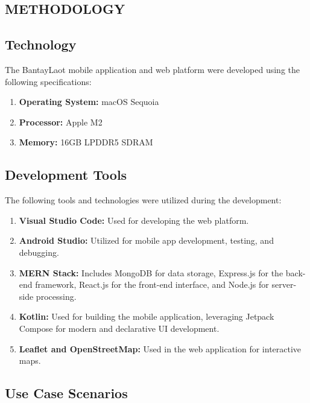 \documentclass{icsthesis}
\begin{document}
\begin{mainmatter}
        \section{METHODOLOGY}
            \subsection{Technology}
            The BantayLaot mobile application and web platform were developed using the following specifications:
            \begin{enumerate}
                \item \textbf{Operating System:} macOS Sequoia
                \item \textbf{Processor:} Apple M2
                \item \textbf{Memory:} 16GB LPDDR5 SDRAM
            \end{enumerate}
            
            \subsection{Development Tools}
            The following tools and technologies were utilized during the development:
            \begin{enumerate}
                \item \textbf{Visual Studio Code:} Used for developing the web platform.
                \item \textbf{Android Studio:} Utilized for mobile app development, testing, and debugging.
                \item \textbf{MERN Stack:} Includes MongoDB for data storage, Express.js for the back-end framework, React.js for the front-end interface, and Node.js for server-side processing.
                \item \textbf{Kotlin:} Used for building the mobile application, leveraging Jetpack Compose for modern and declarative UI development.
                \item \textbf{Leaflet and OpenStreetMap:} Used in the web application for interactive maps.
            \end{enumerate}
            
            \subsection{Use Case Scenarios}

\end{mainmatter}
\end{document}
